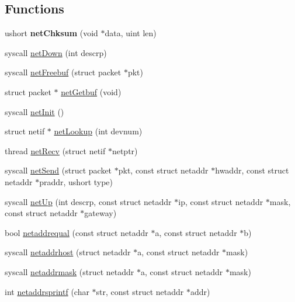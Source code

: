\subsection*{Functions}
\begin{DoxyCompactItemize}
\item 
\hypertarget{group__network_ga185f793896833cc2389da020d37d0d9e}{ushort {\bfseries net\-Chksum} (void $\ast$data, uint len)}\label{group__network_ga185f793896833cc2389da020d37d0d9e}

\item 
syscall \hyperlink{group__network_gac45c2d4b1c31e8d2a75c17fcdda6a77c}{net\-Down} (int descrp)
\item 
syscall \hyperlink{group__network_gae1f8f55dd322e072c3d57749d3a22452}{net\-Freebuf} (struct packet $\ast$pkt)
\item 
struct packet $\ast$ \hyperlink{group__network_gadde7ccba7e66f7e4c52bb7969a92a910}{net\-Getbuf} (void)
\item 
syscall \hyperlink{group__network_gae84240e1a1f1520ed1376f040b2e10e3}{net\-Init} ()
\item 
struct netif $\ast$ \hyperlink{group__network_ga296762f874916f20b45e5935d62bc178}{net\-Lookup} (int devnum)
\item 
thread \hyperlink{group__network_ga714193dc3ba55fe83e6ce9fb9e4926e3}{net\-Recv} (struct netif $\ast$netptr)
\item 
syscall \hyperlink{group__network_ga882a9173c7b941813a15e7f890e3e9a3}{net\-Send} (struct packet $\ast$pkt, const struct netaddr $\ast$hwaddr, const struct netaddr $\ast$praddr, ushort type)
\item 
syscall \hyperlink{group__network_ga80e0d9490cd00d1a9ca6eea1f323d931}{net\-Up} (int descrp, const struct netaddr $\ast$ip, const struct netaddr $\ast$mask, const struct netaddr $\ast$gateway)
\item 
bool \hyperlink{group__network_gabb69f95504d495008cd1bb13a4377efa}{netaddrequal} (const struct netaddr $\ast$a, const struct netaddr $\ast$b)
\item 
syscall \hyperlink{group__network_gaea3d616f64991056ba857ffa8a9d44fd}{netaddrhost} (struct netaddr $\ast$a, const struct netaddr $\ast$mask)
\item 
syscall \hyperlink{group__network_ga77597087eb8994342babb0d121e530aa}{netaddrmask} (struct netaddr $\ast$a, const struct netaddr $\ast$mask)
\item 
int \hyperlink{group__network_gacf354e2fb91290fe82f5b26c09274784}{netaddrsprintf} (char $\ast$str, const struct netaddr $\ast$addr)
\end{DoxyCompactItemize}


